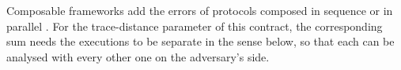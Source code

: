 
Composable frameworks add the errors of protocols composed in sequence or
in parallel \cite[Sec.~II.E]{portmann2022security}. For the trace-distance
parameter of this contract, the corresponding sum needs the executions to
be separate in the sense below, so that each can be analysed with every
other one on the adversary's side.

